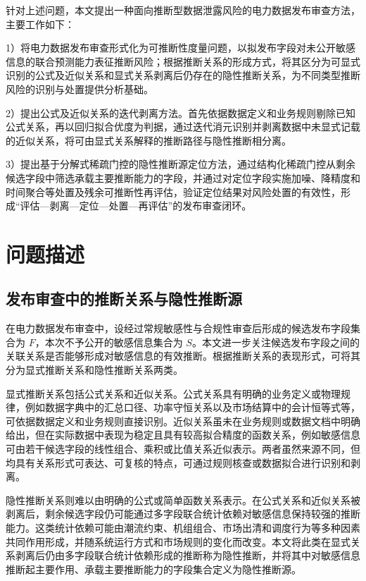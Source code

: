 \documentclass[UTF8,zihao=5,twoside,fontset=none]{ctexart}
\begin{document}
针对上述问题，本文提出一种面向推断型数据泄露风险的电力数据发布审查方法，主要工作如下：

1）将电力数据发布审查形式化为可推断性度量问题，以拟发布字段对未公开敏感信息的联合预测能力表征推断风险；根据推断关系的形成方式，将其区分为可显式识别的公式及近似关系和显式关系剥离后仍存在的隐性推断关系，为不同类型推断风险的识别与处置提供分析基础。

2）提出公式及近似关系的迭代剥离方法。首先依据数据定义和业务规则剔除已知公式关系，再以回归拟合优度为判据，通过迭代消元识别并剥离数据中未显式记载的近似关系，将可由显式关系解释的推断路径与隐性推断相分离。

3）提出基于分解式稀疏门控的隐性推断源定位方法，通过结构化稀疏门控从剩余候选字段中筛选承载主要推断能力的字段，并通过对定位字段实施加噪、降精度和时间聚合等处置及残余可推断性再评估，验证定位结果对风险处置的有效性，形成“评估—剥离—定位—处置—再评估”的发布审查闭环。

\section{问题描述}

\subsection{发布审查中的推断关系与隐性推断源}

在电力数据发布审查中，设经过常规敏感性与合规性审查后形成的候选发布字段集合为 $F$，本次不予公开的敏感信息集合为 $S$。本文进一步关注候选发布字段之间的关联关系是否能够形成对敏感信息的有效推断。根据推断关系的表现形式，可将其分为显式推断关系和隐性推断关系两类。

显式推断关系包括公式关系和近似关系。公式关系具有明确的业务定义或物理规律，例如数据字典中的汇总口径、功率守恒关系以及市场结算中的会计恒等式等，可依据数据定义和业务规则直接识别。近似关系虽未在业务规则或数据文档中明确给出，但在实际数据中表现为稳定且具有较高拟合精度的函数关系，例如敏感信息可由若干候选字段的线性组合、乘积或比值关系近似表示。两者虽然来源不同，但均具有关系形式可表达、可复核的特点，可通过规则核查或数据拟合进行识别和剥离。

隐性推断关系则难以由明确的公式或简单函数关系表示。在公式关系和近似关系被剥离后，剩余候选字段仍可能通过多字段联合统计依赖对敏感信息保持较强的推断能力。这类统计依赖可能由潮流约束、机组组合、市场出清和调度行为等多种因素共同作用形成，并随系统运行方式和市场规则的变化而改变。本文将此类在显式关系剥离后仍由多字段联合统计依赖形成的推断称为隐性推断，并将其中对敏感信息推断起主要作用、承载主要推断能力的字段集合定义为隐性推断源。
\end{document}
